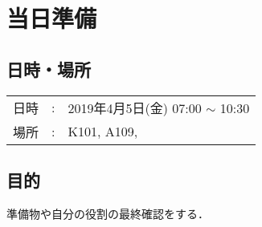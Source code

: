 
%
\section{当日準備}


\subsection{日時・場所}
\begin{tabular}{p{}rp{}}
  日時 & : & 2019年4月5日(金) 07:00 $\sim$ 10:30\\ %
  場所 & : & K101, A109,                                        %
\end{tabular}

\subsection{目的}
準備物や自分の役割の最終確認をする．

